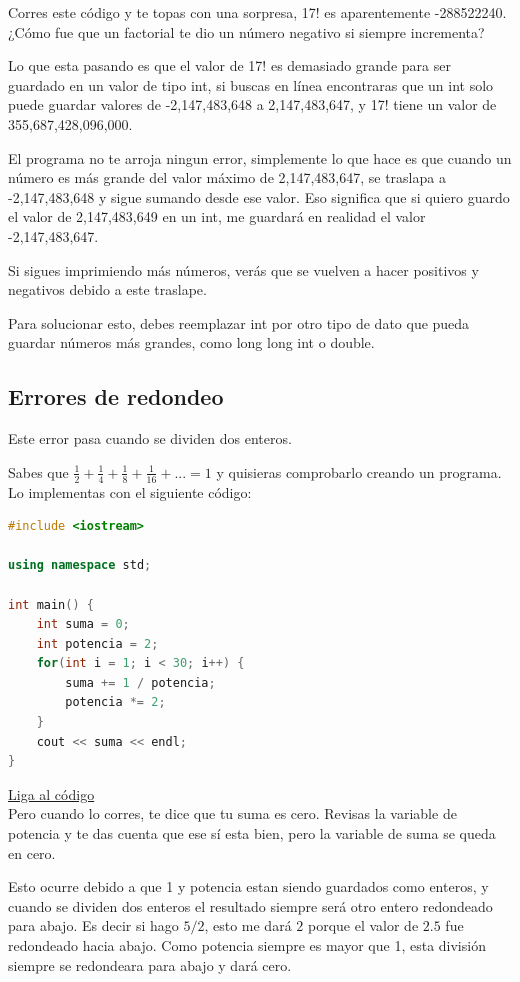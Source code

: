 \documentclass{article}
\begin{document}
Corres este código y te topas con una sorpresa, 17! es aparentemente -288522240. ¿Cómo fue que un factorial te dio un número negativo si siempre incrementa?

Lo que esta pasando es que el valor de 17! es demasiado grande para ser guardado en un valor de tipo int, si buscas en línea encontraras que un int solo puede guardar valores de -2,147,483,648 a 2,147,483,647, y 17! tiene un valor de 355,687,428,096,000.

El programa no te arroja ningun error, simplemente lo que hace es que cuando un número es más grande del valor máximo de 2,147,483,647, se traslapa a -2,147,483,648 y sigue sumando desde ese valor. Eso significa que si quiero guardo el valor de 2,147,483,649 en un int, me guardará en realidad el valor -2,147,483,647.

Si sigues imprimiendo más números, verás que se vuelven a hacer positivos y negativos debido a este traslape.

Para solucionar esto, debes reemplazar int por otro tipo de dato que pueda guardar números más grandes, como long long int o double.

\subsection{Errores de redondeo}
Este error pasa cuando se dividen dos enteros.

Sabes que $\frac{1}{2} + \frac{1}{4} + \frac{1}{8} + \frac{1}{16} + ... = 1$ y quisieras comprobarlo creando un programa. Lo implementas con el siguiente código:

\begin{lstlisting}[language=C++, title=Error de redondeo]
#include <iostream>

using namespace std;

int main() {
	int suma = 0;
	int potencia = 2;
	for(int i = 1; i < 30; i++) {
		suma += 1 / potencia;
		potencia *= 2;
	}
	cout << suma << endl;
}
\end{lstlisting}
\href{https://repl.it/@Jamesscn/Suma-Fraccional}{Liga al código}\\

Pero cuando lo corres, te dice que tu suma es cero. Revisas la variable de potencia y te das cuenta que ese sí esta bien, pero la variable de suma se queda en cero.

Esto ocurre debido a que 1 y potencia estan siendo guardados como enteros, y cuando se dividen dos enteros el resultado siempre será otro entero redondeado para abajo. Es decir si hago $5 / 2$, esto me dará $2$ porque el valor de $2.5$ fue redondeado hacia abajo. Como potencia siempre es mayor que 1, esta división siempre se redondeara para abajo y dará cero.
\end{document}
